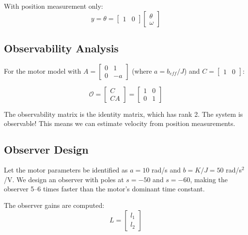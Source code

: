 With position measurement only:
\begin{equation}
y = \theta = \begin{bmatrix} 1 & 0 \end{bmatrix} \begin{bmatrix} \theta \\ \omega \end{bmatrix}
\end{equation}

\subsection{Observability Analysis}

For the motor model with $A = \begin{bmatrix} 0 & 1 \\ 0 & -a \end{bmatrix}$ (where $a = b_{eff}/J$) and $C = \begin{bmatrix} 1 & 0 \end{bmatrix}$:

\begin{equation}
\mathcal{O} = \begin{bmatrix} C \\ CA \end{bmatrix}
= \begin{bmatrix} 1 & 0 \\ 0 & 1 \end{bmatrix}
\end{equation}

The observability matrix is the identity matrix, which has rank 2. The system is observable! This means we can estimate velocity from position measurements.

\subsection{Observer Design}

Let the motor parameters be identified as $a = 10$ rad/s and $b = K/J = 50$ rad/s$^2$/V. We design an observer with poles at $s = -50$ and $s = -60$, making the observer 5--6 times faster than the motor's dominant time constant.

The observer gains are computed:
\begin{equation}
L = \begin{bmatrix} l_1 \\ l_2 \end{bmatrix}
\end{equation}

